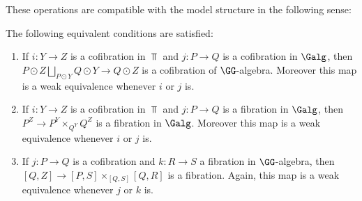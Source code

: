 \documentclass[a4paper,10pt]{amsart}
\begin{document}
These operations are compatible with the model structure in the following sense:
\begin{lemma}\label{complem}
	The following equivalent conditions are satisfied:
	\begin{enumerate}
		\item \label{lem1} If $i \colon Y \to Z$ is a cofibration in $\Top$ and $j \colon P \to Q$ is a cofibration in $\Galg$, then $P \odot Z \bigsqcup_{P \odot Y} Q \odot Y \to Q \odot Z$ is a cofibration of $\GG$-algebra. Moreover this map is a weak equivalence whenever $i$ or $j$ is.
		\item  \label{lem2} If $i \colon Y \to Z$ is a cofibration in $\Top$ and $j \colon P \to Q$ is a fibration in $\Galg$, then $P^Z \to P^Y \times_{Q^Y} Q^Z$ is a fibration in $\Galg$. Moreover this map is a weak equivalence whenever $i$ or $j$ is.
		\item If $j \colon P \to Q$ is a cofibration and $k \colon R \to S$ a fibration in $\GG$-algebra, then $[Q,Z] 	\to [P,S] \times_{[Q,S]} [Q,R]$ is a fibration. Again, this map is a weak equivalence whenever $j$ or $k$ is.
	\end{enumerate}
\end{lemma}
\end{document}
